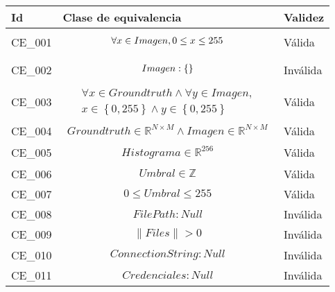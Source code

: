 \documentclass{scrreprt}
\begin{document}
\begin{center}
    \begin{tabular}{|p{2.0cm}|p{8.0cm}|p{3.0cm}|}
        \hline
	    \textbf{Id} & \textbf{Clase de equivalencia} & \textbf{Validez} \\
        \hline
	    CE_001 & \begin{gather*} \forall x \space \in Imagen, 0\leq x \leq 255  \end{gather*} & Válida \\
        \hline
        CE_002 & 
        \begin{gather*}
        	Imagen: \left\{\space \right\}   
		\end{gather*} &   	
        Inválida \\
        \hline
        CE_003 & 
        \begin{gather*}
        	\forall x \in Groundtruth  \wedge  \forall y \in Imagen, \\
            x \in \left\{0,255\right\} \wedge  y \in \left\{0,255\right\} 				
        \end{gather*} &
        Válida \\
        \hline
        CE_004 &  \begin{gather*} Groundtruth \in \mathbb{R}^{N\times M} \wedge Imagen \in \mathbb{R}^{N\times M} 			\end{gather*}  & Válida \\
        \hline
        CE_005 & \begin{gather*} Histograma \in \mathbb{R}^{256} \end{gather*} & Válida \\
        \hline
        CE_006 & \begin{gather*} Umbral \in \mathbb{Z} \end{gather*} & Válida \\
        \hline
        CE_007 & \begin{gather*} 0 \leq Umbral \leq 255 \end{gather*} & Válida \\
        \hline
        CE_008 & \begin{gather*} FilePath: Null  \end{gather*} & Inválida \\
        \hline
        CE_009 & \begin{gather*} \parallel Files \parallel >  0  \end{gather*} & Inválida \\
        \hline
        CE_010 & \begin{gather*} ConnectionString: Null  \end{gather*} & Inválida \\
        \hline
        CE_011 & \begin{gather*} Credenciales: Null  \end{gather*} & Inválida \\
        \hline
        
	\end{tabular}
\end{center}
\end{document}
